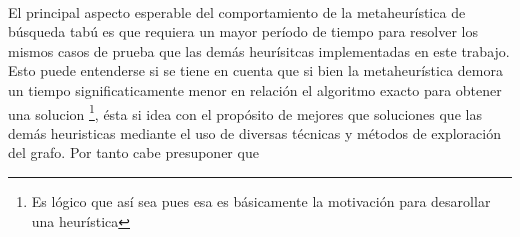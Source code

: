 \paragraph{}
El principal aspecto esperable del comportamiento de la metaheurística de búsqueda tabú es que requiera un mayor período de tiempo para resolver los mismos casos de prueba que las demás heurísitcas implementadas en este trabajo. Esto puede entenderse si se tiene en cuenta que si bien la metaheurística demora un tiempo significaticamente menor en relación el algoritmo exacto para obtener una solucion \footnote{Es lógico que así sea pues esa es básicamente la motivación para desarollar una heurística}, ésta si idea con el propósito de mejores que soluciones que las demás heuristicas mediante el uso de diversas técnicas y métodos de exploración del grafo. Por tanto cabe presuponer que 




